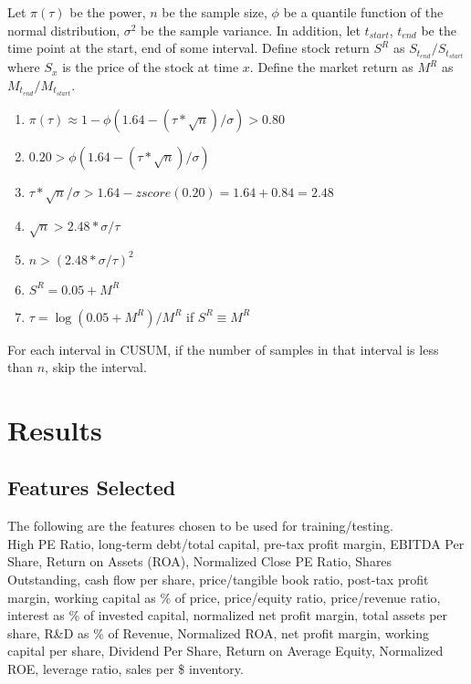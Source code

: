 \documentclass[preprint,12pt]{elsarticle}
\begin{document}
Let $\pi(\tau)$ be the power, $n$ be the sample size, $\phi$ be a quantile function of the normal distribution, $\sigma^{2}$ be the sample variance. In addition, let $t_{start}$, $t_{end}$ be the time point at the start, end of some interval. Define stock return $S^{R}$ as $S_{t_{end}} / S_{t_{start}}$ where $S_{x}$ is the price of the stock at time $x$. Define the market return as $M^{R}$ as $M_{t_{end}} / M_{t_{start}}$.\\

\begin{enumerate}
	\item $\pi(\tau) \approx 1 - \phi(1.64 - (\tau * \sqrt{n}) / \sigma) > 0.80$
    \item $ 0.20 > \phi(1.64 - (\tau * \sqrt{n}) / \sigma)$
    \item $\tau*\sqrt{n} / \sigma > 1.64 - zscore(0.20) = 1.64 + 0.84 = 2.48 $
    \item $\sqrt{n} > 2.48*\sigma / \tau$
    \item $n > (2.48*\sigma / \tau)^{2}$
    \item $S^{R} = 0.05 + M^{R}$
    \item $\tau = \log{(0.05+M^{R}) / M^{R}}$ if $S^{R} \equiv M^{R}$
    
\end{enumerate}

For each interval in CUSUM, if the number of samples in that interval is less than $n$, skip the interval. 

\section{Results}
\label{S:3}

\subsection{Features Selected}
The following are the features chosen to be used for training/testing. \\

High PE Ratio, long-term debt/total capital, pre-tax profit margin, EBITDA Per Share, Return on Assets (ROA), Normalized Close PE Ratio, Shares Outstanding, cash flow per share, price/tangible book ratio, post-tax profit margin, working capital as \% of price, price/equity ratio, price/revenue ratio, interest as \% of invested capital, normalized net profit margin, total assets per share, R\&D as \% of Revenue, Normalized ROA, net profit margin, working capital per share, Dividend Per Share, Return on Average Equity, Normalized ROE, leverage ratio, sales per \$ inventory.
\end{document}
